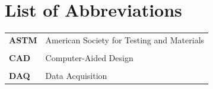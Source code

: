 \chapter*{List of Abbreviations}

{}

\begin{longtable}{p{3cm} p{10cm}}


	\textbf{ASTM}     & American Society for Testing and Materials \\

	\\
	\textbf{CAD}      & Computer-Aided Design \\

	\\
	\textbf{DAQ}      & Data Acquisition \\


\end{longtable}
